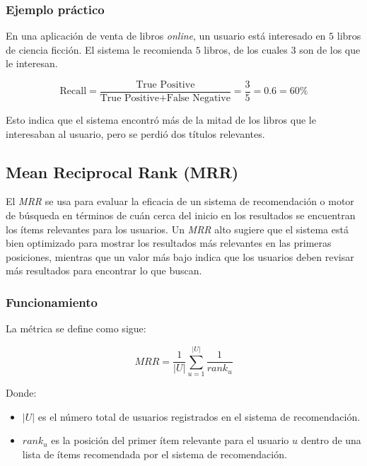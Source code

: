 \documentclass[11pt,a4paper,twoside]{thesis}
\begin{document}
\subsubsection{Ejemplo práctico}
En una aplicación de venta de libros \textit{online}, un usuario está interesado en $5$ libros de ciencia ficción. El sistema le recomienda $5$ libros, de los cuales $3$ son de los que le interesan.

\begin{equation}
	\text{Recall} = \frac{\text{True Positive}}{\text{True Positive} + \text{False Negative}} = \frac{3}{5} = 0.6 = 60\%
\end{equation}

Esto indica que el sistema encontró más de la mitad de los libros que le interesaban al usuario, pero se perdió dos títulos relevantes.

\subsection{Mean Reciprocal Rank (MRR)}

El \textit{MRR} se usa para evaluar la eficacia de un sistema de recomendación o motor de búsqueda en términos de cuán cerca del inicio en los resultados se encuentran los ítems relevantes para los usuarios. Un \textit{MRR} alto sugiere que el sistema está bien optimizado para mostrar los resultados más relevantes en las primeras posiciones, mientras que un valor más bajo indica que los usuarios deben revisar más resultados para encontrar lo que buscan.

\subsubsection{Funcionamiento}

La métrica se define como sigue:

\begin{equation}
	MRR= \frac{1}{|U|} \sum_{u=1}^{|U|} \frac{1}{rank_u}
\end{equation}

Donde:

\begin{itemize}
	\item $|U|$ es el número total de usuarios registrados en el sistema de recomendación.
	\item $rank_u$ es la posición del primer ítem relevante para el usuario $u$ dentro de una lista de ítems recomendada por el sistema de recomendación.
\end{itemize}
\end{document}
